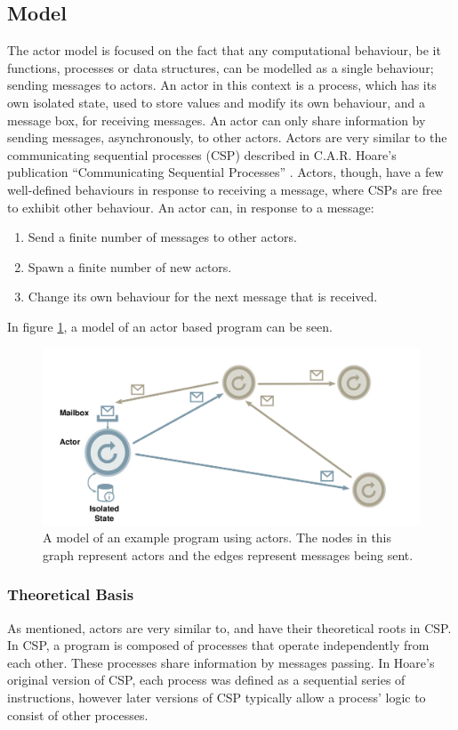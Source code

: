 \subsection{Model}
The actor model is focused on the fact that any computational behaviour, be it functions, processes or data structures, can be modelled as a single behaviour; sending messages to actors.
An actor in this context is a process, which has its own isolated state, used to store values and modify its own behaviour, and a message box, for receiving messages. An actor can only share information by sending messages, asynchronously, to other actors.
Actors are very similar to the communicating sequential processes (CSP) described in C.A.R. Hoare's publication \enquote{Communicating Sequential Processes} \cite{hoare1985communicating}. Actors, though, have a few well-defined behaviours in response to receiving a message, where CSPs are free to exhibit other behaviour. An actor can, in response to a message: 

\begin{enumerate}
  \item Send a finite number of messages to other actors.
  \item Spawn a finite number of new actors.
  \item Change its own behaviour for the next message that is received.
\end{enumerate}

In figure \ref{fig:actor}, a model of an actor based program can be seen.

\begin{figure}
  \includegraphics[width=\textwidth]{Images/actors.pdf}
  \caption{A model of an example program using actors. The nodes in this graph represent actors and the edges represent messages being sent.}
  \label{fig:actor}
\end{figure}

\subsubsection{Theoretical Basis} 
As mentioned, actors are very similar to, and have their theoretical roots in CSP.
In CSP, a program is composed of processes that operate independently from each other. These processes share information by messages passing. In Hoare's original version of CSP, each process was defined as a sequential series of instructions, however later versions of CSP typically allow a process' logic to consist of other processes.

